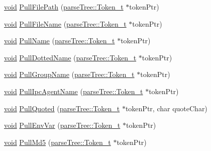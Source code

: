 \begin{DoxyCompactItemize}
\item 
\hyperlink{_t_e_m_p_l_a_t_e__cdef_8h_ac9c84fa68bbad002983e35ce3663c686}{void} \hyperlink{class_lexer__t_aef844d744f2568fe03579f44c680f5cc}{Pull\+File\+Path} (\hyperlink{structparse_tree_1_1_token__t}{parse\+Tree\+::\+Token\+\_\+t} $\ast$token\+Ptr)
\item 
\hyperlink{_t_e_m_p_l_a_t_e__cdef_8h_ac9c84fa68bbad002983e35ce3663c686}{void} \hyperlink{class_lexer__t_a28b6c868282e0c31aeae91d67d9308b3}{Pull\+File\+Name} (\hyperlink{structparse_tree_1_1_token__t}{parse\+Tree\+::\+Token\+\_\+t} $\ast$token\+Ptr)
\item 
\hyperlink{_t_e_m_p_l_a_t_e__cdef_8h_ac9c84fa68bbad002983e35ce3663c686}{void} \hyperlink{class_lexer__t_a83ac5912deb23251183ba25d333d8573}{Pull\+Name} (\hyperlink{structparse_tree_1_1_token__t}{parse\+Tree\+::\+Token\+\_\+t} $\ast$token\+Ptr)
\item 
\hyperlink{_t_e_m_p_l_a_t_e__cdef_8h_ac9c84fa68bbad002983e35ce3663c686}{void} \hyperlink{class_lexer__t_a70ecad48f80faca7d7c9ef2a17bd15a5}{Pull\+Dotted\+Name} (\hyperlink{structparse_tree_1_1_token__t}{parse\+Tree\+::\+Token\+\_\+t} $\ast$token\+Ptr)
\item 
\hyperlink{_t_e_m_p_l_a_t_e__cdef_8h_ac9c84fa68bbad002983e35ce3663c686}{void} \hyperlink{class_lexer__t_aced857ba012be93e34e7b646fce7187b}{Pull\+Group\+Name} (\hyperlink{structparse_tree_1_1_token__t}{parse\+Tree\+::\+Token\+\_\+t} $\ast$token\+Ptr)
\item 
\hyperlink{_t_e_m_p_l_a_t_e__cdef_8h_ac9c84fa68bbad002983e35ce3663c686}{void} \hyperlink{class_lexer__t_abde46bf45d6eba42f3b160d69afd0993}{Pull\+Ipc\+Agent\+Name} (\hyperlink{structparse_tree_1_1_token__t}{parse\+Tree\+::\+Token\+\_\+t} $\ast$token\+Ptr)
\item 
\hyperlink{_t_e_m_p_l_a_t_e__cdef_8h_ac9c84fa68bbad002983e35ce3663c686}{void} \hyperlink{class_lexer__t_a2b4297ec19cdf9b4d11fee727c026af2}{Pull\+Quoted} (\hyperlink{structparse_tree_1_1_token__t}{parse\+Tree\+::\+Token\+\_\+t} $\ast$token\+Ptr, char quote\+Char)
\item 
\hyperlink{_t_e_m_p_l_a_t_e__cdef_8h_ac9c84fa68bbad002983e35ce3663c686}{void} \hyperlink{class_lexer__t_a8449d6b2d79f6bc37b59306c238eeb99}{Pull\+Env\+Var} (\hyperlink{structparse_tree_1_1_token__t}{parse\+Tree\+::\+Token\+\_\+t} $\ast$token\+Ptr)
\item 
\hyperlink{_t_e_m_p_l_a_t_e__cdef_8h_ac9c84fa68bbad002983e35ce3663c686}{void} \hyperlink{class_lexer__t_a7cf14c3c28b8e4a7800a353b0e2baa2b}{Pull\+Md5} (\hyperlink{structparse_tree_1_1_token__t}{parse\+Tree\+::\+Token\+\_\+t} $\ast$token\+Ptr)

\end{DoxyCompactItemize}
